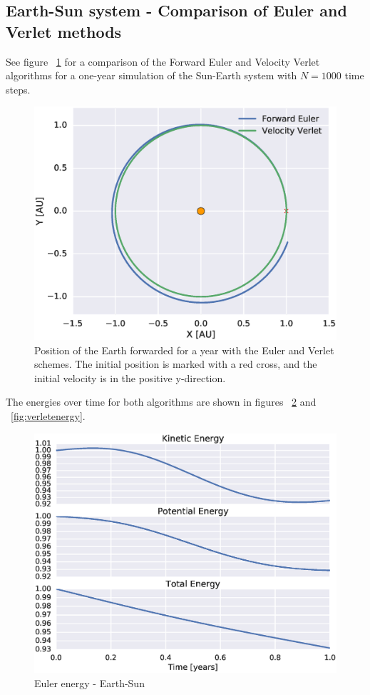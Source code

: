 \documentclass[aps,reprint]{revtex4-1}
\begin{document}
\subsection{Earth-Sun system - Comparison of Euler and Verlet methods}
\label{sec:earthsunresults}
See figure ~\ref{fig:earthsunorbits} for a comparison of the Forward Euler and
Velocity Verlet algorithms for a one-year simulation of the Sun-Earth system with
$N = 1000$ time steps.
\begin{figure}[H]
  \centering
  \includegraphics[width=\columnwidth]{figures/eulerverlet.eps}
  \caption{Position of the Earth forwarded for a year with the Euler and Verlet
  schemes. The initial position is marked with a red cross, and the initial
  velocity is in the positive y-direction.}
  \label{fig:earthsunorbits}
\end{figure}
The energies over time for both algorithms
are shown in figures ~\ref{fig:eulerenergy} and ~\ref{fig:verletenergy}.
\begin{figure}[H]
  \includegraphics[width=\columnwidth]{figures/energy_euler.eps}
  \caption{Euler energy - Earth-Sun}
  \label{fig:eulerenergy}
\end{figure}
\end{document}
